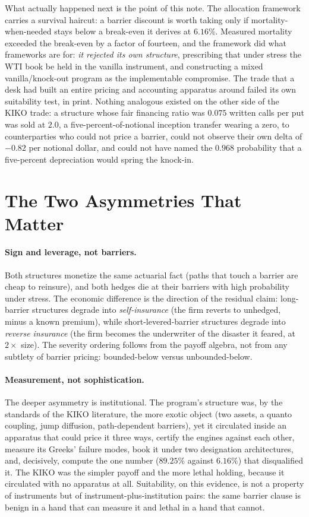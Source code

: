 \documentclass[11pt,a4paper]{article}
\begin{document}
What actually happened next is the point of this note. The allocation framework carries a survival haircut: a barrier discount is worth taking only if mortality-when-needed stays below a break-even it derives at $6.16\%$. Measured mortality exceeded the break-even by a factor of fourteen, and the framework did what frameworks are for: \emph{it rejected its own structure}, prescribing that under stress the WTI book be held in the vanilla instrument, and constructing a mixed vanilla/knock-out program as the implementable compromise. The trade that a desk had built an entire pricing and accounting apparatus around failed its own suitability test, in print. Nothing analogous existed on the other side of the KIKO trade: a structure whose fair financing ratio was $0.075$ written calls per put was sold at $2.0$, a five-percent-of-notional inception transfer wearing a zero, to counterparties who could not price a barrier, could not observe their own delta of $-0.82$ per notional dollar, and could not have named the $0.968$ probability that a five-percent depreciation would spring the knock-in.

\section{The Two Asymmetries That Matter}
\label{sec:asym}

\paragraph{Sign and leverage, not barriers.} Both structures monetize the same actuarial fact (paths that touch a barrier are cheap to reinsure), and both hedges die at their barriers with high probability under stress. The economic difference is the direction of the residual claim: long-barrier structures degrade into \emph{self-insurance} (the firm reverts to unhedged, minus a known premium), while short-levered-barrier structures degrade into \emph{reverse insurance} (the firm becomes the underwriter of the disaster it feared, at $2\times$ size). The severity ordering follows from the payoff algebra, not from any subtlety of barrier pricing: bounded-below versus unbounded-below.

\paragraph{Measurement, not sophistication.} The deeper asymmetry is institutional. The program's structure was, by the standards of the KIKO literature, the more exotic object (two assets, a quanto coupling, jump diffusion, path-dependent barriers), yet it circulated inside an apparatus that could price it three ways, certify the engines against each other, measure its Greeks' failure modes, book it under two designation architectures, and, decisively, compute the one number ($89.25\%$ against $6.16\%$) that disqualified it. The KIKO was the simpler payoff and the more lethal holding, because it circulated with no apparatus at all. Suitability, on this evidence, is not a property of instruments but of instrument-plus-institution pairs: the same barrier clause is benign in a hand that can measure it and lethal in a hand that cannot.
\end{document}

